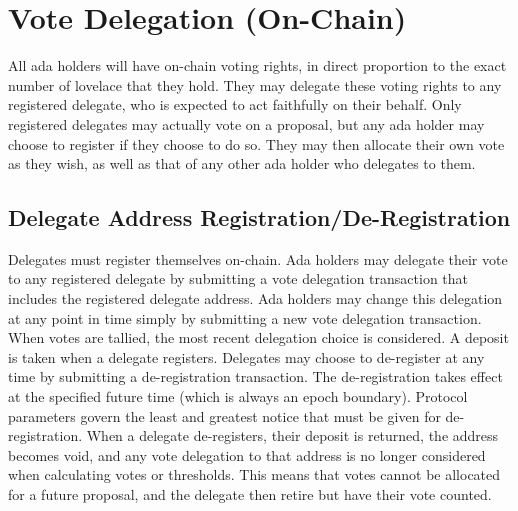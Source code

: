 \newpage
\section{Vote Delegation (On-Chain)}
\label{sect:delegation}

All ada holders will have on-chain voting rights, in direct proportion to the exact number of lovelace that they hold.
They may delegate these voting rights to any registered delegate, who is expected to act faithfully on their behalf.
Only registered delegates may actually vote on a proposal, but any ada holder may choose to register if they choose to do so.
They may then allocate their own vote as they wish, as well as that of any other ada holder who delegates to them.


\subsection{Delegate Address Registration/De-Registration}
\label{sect:registration}

Delegates must register themselves on-chain.  Ada holders may delegate their
vote to any registered delegate by submitting a vote delegation transaction that includes the registered delegate address.
Ada holders may change this delegation at any point in time simply by submitting a new vote delegation transaction.  When votes are tallied, the most recent delegation choice is considered.
A deposit is taken when a delegate registers.  Delegates may choose to de-register at any time by submitting a de-registration transaction.  The de-registration takes effect
at the specified future time (which is always an epoch boundary).  Protocol parameters govern the least and greatest notice that must be given for de-registration.  When a delegate de-registers, their deposit is returned,
the address becomes void, and any vote delegation to that address is no longer considered when calculating votes or thresholds.  This means that votes cannot be allocated for a future proposal, and the delegate then
retire but have their vote counted.

